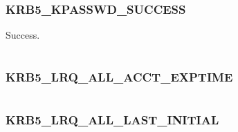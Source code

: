 \documentclass[letterpaper,10pt,english]{sphinxmanual}
\begin{document}
\subsubsection{KRB5\_KPASSWD\_SUCCESS}
\label{appdev/refs/macros/KRB5_KPASSWD_SUCCESS:krb5-kpasswd-success-data}\label{appdev/refs/macros/KRB5_KPASSWD_SUCCESS::doc}\label{appdev/refs/macros/KRB5_KPASSWD_SUCCESS:krb5-kpasswd-success}

\begin{fulllineitems}
\label{appdev/refs/macros/KRB5_KPASSWD_SUCCESS:KRB5_KPASSWD_SUCCESS}
\end{fulllineitems}


Success.

\begin{tabulary}{\linewidth}{|L|L|}
\hline

 & 
\\
\hline\end{tabulary}



\subsubsection{KRB5\_LRQ\_ALL\_ACCT\_EXPTIME}
\label{appdev/refs/macros/KRB5_LRQ_ALL_ACCT_EXPTIME::doc}\label{appdev/refs/macros/KRB5_LRQ_ALL_ACCT_EXPTIME:krb5-lrq-all-acct-exptime}\label{appdev/refs/macros/KRB5_LRQ_ALL_ACCT_EXPTIME:krb5-lrq-all-acct-exptime-data}

\begin{fulllineitems}
\label{appdev/refs/macros/KRB5_LRQ_ALL_ACCT_EXPTIME:KRB5_LRQ_ALL_ACCT_EXPTIME}
\end{fulllineitems}


\begin{tabulary}{\linewidth}{|L|L|}
\hline

 & 
\\
\hline\end{tabulary}



\subsubsection{KRB5\_LRQ\_ALL\_LAST\_INITIAL}
\label{appdev/refs/macros/KRB5_LRQ_ALL_LAST_INITIAL::doc}\label{appdev/refs/macros/KRB5_LRQ_ALL_LAST_INITIAL:krb5-lrq-all-last-initial}\label{appdev/refs/macros/KRB5_LRQ_ALL_LAST_INITIAL:krb5-lrq-all-last-initial-data}
\end{document}
